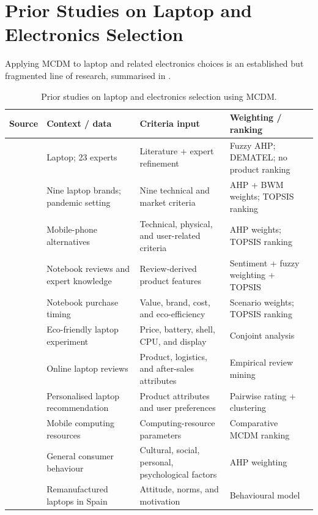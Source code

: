 \section{Prior Studies on Laptop and Electronics Selection}\label{sec:prior-studies}

Applying MCDM to laptop and related electronics choices is an established but fragmented line of
research, summarised in .

\begin{table}[H]
  \centering
  \caption{Prior studies on laptop and electronics selection using MCDM.}
  \label{tab:prior-studies}
  \footnotesize
  \setlength{\tabcolsep}{4pt}
  \begin{tabularx}{\textwidth}{@{}L{3.1cm}L{3.4cm}L{3.6cm}Y@{}}
    \toprule
    \textbf{Source} & \textbf{Context / data} & \textbf{Criteria input} & \textbf{Weighting / ranking} \\
    \midrule
    \textcite{sonmez_cakir_determination_2020} & Laptop; 23 experts & Literature + expert refinement & Fuzzy AHP; DEMATEL; no product ranking \\
    \textcite{gaur_application_2023} & Nine laptop brands; pandemic setting & Nine technical and market criteria & AHP + BWM weights; TOPSIS ranking \\
    \textcite{weng_siew_lam_evaluation_2023} & Mobile-phone alternatives & Technical, physical, and user-related criteria & AHP weights; TOPSIS ranking \\
    \textcite{maghsoudi_hybrid_2026} & Notebook reviews and expert knowledge & Review-derived product features & Sentiment + fuzzy weighting + TOPSIS \\
    \textcite{rau_optimal_2018} & Notebook purchase timing & Value, brand, cost, and eco-efficiency & Scenario weights; TOPSIS ranking \\
    \textcite{liao_determinants_2022} & Eco-friendly laptop experiment & Price, battery, shell, CPU, and display & Conjoint analysis \\
    \textcite{kang_study_2022} & Online laptop reviews & Product, logistics, and after-sales attributes & Empirical review mining \\
    \textcite{guan_cognitive_2022} & Personalised laptop recommendation & Product attributes and user preferences & Pairwise rating + clustering \\
    \textcite{pramanik_comparative_2021} & Mobile computing resources & Computing-resource parameters & Comparative MCDM ranking \\
    \textcite{sostar_assessment_2023} & General consumer behaviour & Cultural, social, personal, psychological factors & AHP weighting \\
    \textcite{jimenez-parra_key_2014} & Remanufactured laptops in Spain & Attitude, norms, and motivation & Behavioural model \\
    \bottomrule
  \end{tabularx}
\end{table}

